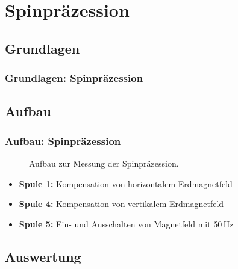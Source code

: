 
\section{Spinpräzession}
\subsection{Grundlagen}
\begin{frame}
\frametitle{Grundlagen: Spinpräzession}
  
\end{frame}

\subsection{Aufbau}
\begin{frame}
\frametitle{Aufbau: Spinpräzession}

\begin{figure}
    \centering
    \def\svgwidth{\textwidth}
    
    \caption{Aufbau zur Messung der Spinpräzession.}
\end{figure}

\begin{itemize}
  \item \textbf{Spule 1:} Kompensation von horizontalem Erdmagnetfeld
  \item \textbf{Spule 4:} Kompensation von vertikalem Erdmagnetfeld
  \item \textbf{Spule 5:} Ein- und Ausschalten von Magnetfeld mit 50\,Hz
\end{itemize}

\end{frame}

\subsection{Auswertung}

